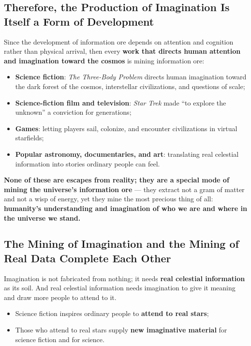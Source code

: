 \documentclass[11pt,fontset=none]{ctexart}
\begin{document}
\subsection{Therefore, the Production of Imagination Is Itself a Form of Development}

Since the development of information ore depends on attention and cognition rather than physical arrival, then every \textbf{work that directs human attention and imagination toward the cosmos} is mining information ore:

\begin{itemize}
  \item \textbf{Science fiction}: \emph{The Three-Body Problem} directs human imagination toward the dark forest of the cosmos, interstellar civilizations, and questions of scale;
  \item \textbf{Science-fiction film and television}: \emph{Star Trek} made ``to explore the unknown'' a conviction for generations;
  \item \textbf{Games}: letting players sail, colonize, and encounter civilizations in virtual starfields;
  \item \textbf{Popular astronomy, documentaries, and art}: translating real celestial information into stories ordinary people can feel.
\end{itemize}

\textbf{None of these are escapes from reality; they are a special mode of mining the universe's information ore} — they extract not a gram of matter and not a wisp of energy, yet they mine the most precious thing of all: \textbf{humanity's understanding and imagination of who we are and where in the universe we stand.}

\subsection{The Mining of Imagination and the Mining of Real Data Complete Each Other}

Imagination is not fabricated from nothing; it needs \textbf{real celestial information} as its soil. And real celestial information needs imagination to give it meaning and draw more people to attend to it.

\begin{itemize}
  \item Science fiction inspires ordinary people to \textbf{attend to real stars};
  \item Those who attend to real stars supply \textbf{new imaginative material} for science fiction and for science.
\end{itemize}
\end{document}
